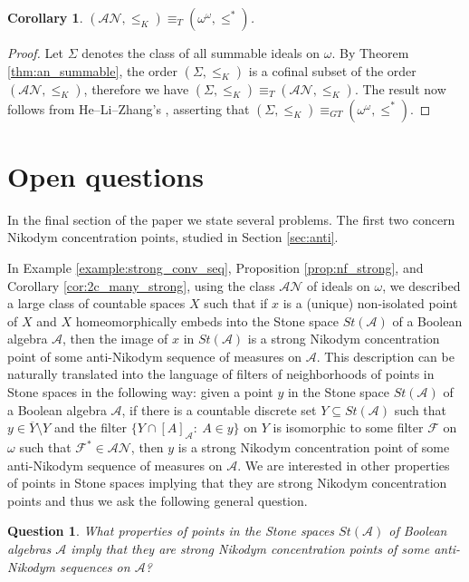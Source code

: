 \documentclass[a4paper,11pt,fleqn]{amsart}
\newtheorem{question}[theorem]{Question}
\newtheorem{corollary}[theorem]{Corollary}
\theoremstyle{definition}
\theoremstyle{remark}
\numberwithin{equation}{section}
\newcommand{\N}{\mathbb{N}}
\newcommand{\aA}{\mathcal{A}}
\newcommand{\fF}{\mathcal{F}}
\newcommand{\nN}{\mathcal{N}}
\newcommand{\ol}{\overline}
\newcommand{\sm}{\setminus}
\newcommand{\sub}{\subseteq}
\newcommand{\clopen}[1]{\left[#1\right]}
\newcommand{\oo}{\omega^\omega}%
\begin{document}
\begin{corollary}\label{cor:tukey}
$(\aA\nN,\leq_K)\equiv_T(\oo, \leq^*)$.
\end{corollary}
\begin{proof}
Let $\Sigma$ denotes the class of all summable ideals on $\omega$. By Theorem \ref{thm:an_summable}, the order $(\Sigma,\leq_K)$ is a cofinal subset of the order $(\aA\nN,\leq_K)$, therefore we have $(\Sigma,\leq_K)\equiv_T(\aA\nN,\leq_K)$. The result now follows from He--Li--Zhang's \cite[Theorem 5.6]{HLZ}, asserting that $(\Sigma,\leq_K)\equiv_{GT}(\oo, \leq^*)$.
\end{proof}

\section{Open questions\label{sec:questions}}

In the final section of the paper we state several problems. The first two concern Nikodym concentration points, studied in Section \ref{sec:anti}.

In Example \ref{example:strong_conv_seq}, Proposition \ref{prop:nf_strong}, and Corollary \ref{cor:2c_many_strong}, using the class $\aA\nN$ of ideals on $\omega$, we described a large class of countable spaces $X$ such that if $x$ is a (unique) non-isolated point of $X$ and $X$ homeomorphically embeds into the Stone space $St(\aA)$ of a Boolean algebra $\aA$, then the image of $x$ in $St(\aA)$ is a strong Nikodym concentration point of some anti-Nikodym sequence of measures on $\aA$. This description can be naturally translated into the language of filters of neighborhoods of points in Stone spaces in the following way: given a point $y$ in the Stone space $St(\aA)$ of a Boolean algebra $\aA$, if there is a countable discrete set $Y\sub St(\aA)$ such that $y\in\ol{Y}\sm Y$ and the filter $\big\{Y\cap\clopen{A}_\aA\colon\ A\in y\big\}$ on $Y$ is isomorphic to some filter $\fF$ on $\omega$ such that $\fF^*\in\aA\nN$, then $y$ is a strong Nikodym concentration point of some anti-Nikodym sequence of measures on $\aA$. We are interested in other properties of points in Stone spaces implying that they are strong Nikodym concentration points and thus we ask the following general question.

\begin{question}\label{ques:type_sncp}
    What properties of points in the Stone spaces $St(\aA)$ of Boolean algebras $\aA$ imply that they are strong Nikodym concentration points of some anti-Nikodym sequences on $\aA$?
\end{question}
\end{document}
